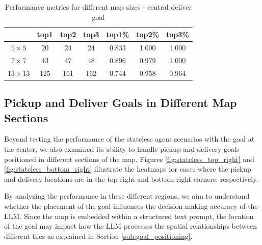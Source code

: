 \vspace{5mm}
\begin{table}[!ht]
  \centering
  \begin{tabular}{c|ccc|ccc}
                   & top1 & top2 & top3 & top1\% & top2\% & top3\% \\
    \hline
    $5 \times 5$   & 20   & 24   & 24   & 0.833  & 1.000  & 1.000  \\
    $7 \times 7$   & 43   & 47   & 48   & 0.896  & 0.979  & 1.000  \\
    $13 \times 13$ & 125  & 161  & 162  & 0.744  & 0.958  & 0.964  \\
  \end{tabular}
  \caption{Performance metrics for different map sizes - central deliver goal}
  \label{tab:performance}
\end{table}
\vspace{5mm}

\subsection{Pickup and Deliver Goals in Different Map Sections}

Beyond testing the performance of the stateless agent scenarios with the goal at
the center, we also examined its ability to handle pickup and delivery goals positioned
in different sections of the map. Figures \ref{fig:stateless_top_right} and
\ref{fig:stateless_bottom_right} illustrate the heatmaps for cases where the
pickup and delivery locations are in the top-right and bottom-right corners, respectively.

By analyzing the performance in these different regions, we aim to understand
whether the placement of the goal influences the decision-making accuracy of the
LLM. Since the map is embedded within a structured text prompt, the location of
the goal may impact how the LLM processes the spatial relationships between
different tiles as explained in Section \ref{sub:goal_positioning}.

